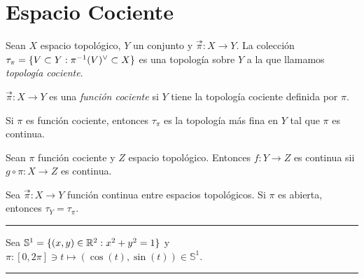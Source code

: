 \section*{Espacio Cociente}

\begin{proposition}
    Sean \(X\) espacio topológico, \(Y\) un conjunto y \(\overset{\twoheadrightarrow}{\pi}:X\to Y\). La colección \(\tau_\pi = \{V\subset Y: \pi^{-1}(V)^\ab\subset X\}\) es una topología sobre \(Y\) a la que llamamos \emph{topología cociente}. 
\end{proposition}
\begin{definition}
    \(\overset{\twoheadrightarrow}{\pi}: X\to Y\) es una \emph{función cociente} si \(Y\) tiene la topología cociente definida por \(\pi\). 
\end{definition}
\begin{proposition}
    Si \(\pi\) es función cociente, entonces \(\tau_\pi\) es la topología más fina en \(Y\) tal que \(\pi\) es continua. 
\end{proposition}
\begin{proposition}
    Sean \(\pi\) función cociente y \(Z\) espacio topológico. Entonces \(f:Y\to Z \) es continua sii \(g\circ \pi: X\to Z\) es continua. 
\end{proposition}
\begin{proposition}
    Sea \(\overset{\twoheadrightarrow}{\pi}:X\to Y\) función continua entre espacios topológicos. Si \(\pi\) es abierta, entonces \(\tau_Y = \tau_\pi\).  
\end{proposition}

\E

\hrule 
\begin{example}
    Sea \(\mathbb{S}^1= \{(x,y)\in \mathbb{R}^2: x^2+y^2=1\}\) y \(\pi: [0,2\pi]\ni t \mapsto (\cos(t),\sin(t)) \in \mathbb{S}^1\).
\end{example}
\hrule 

\E
\newcommand{\D}{\mathcal{D}}
\newcommand{\A}{\mathcal{A}}

